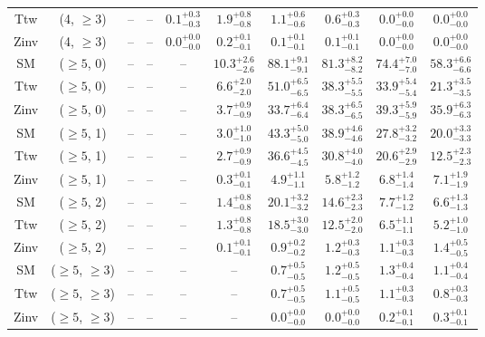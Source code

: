 \begin{table}[h!]
{\begin{tabular}{cccccccccc}
	Ttw & (4, $\ge3$) & -- & -- & $0.1^{+ 0.3 }_{- 0.3 }$ & $1.9^{+ 0.8 }_{- 0.8 }$ & $1.1^{+ 0.6 }_{- 0.6 }$ & $0.6^{+ 0.3 }_{- 0.3 }$ & $0.0^{+ 0.0 }_{- 0.0 }$ & $0.0^{+ 0.0 }_{- 0.0 }$ \\[0.5ex] 
	Zinv & (4, $\ge3$) & -- & -- & $0.0^{+ 0.0 }_{- 0.0 }$ & $0.2^{+ 0.1 }_{- 0.1 }$ & $0.1^{+ 0.1 }_{- 0.1 }$ & $0.1^{+ 0.1 }_{- 0.1 }$ & $0.0^{+ 0.0 }_{- 0.0 }$ & $0.0^{+ 0.0 }_{- 0.0 }$ \\[0.5ex] 
	SM & ($\ge5$, 0) & -- & -- & -- & $10.3^{+ 2.6 }_{- 2.6 }$ & $88.1^{+ 9.1 }_{- 9.1 }$ & $81.3^{+ 8.2 }_{- 8.2 }$ & $74.4^{+ 7.0 }_{- 7.0 }$ & $58.3^{+ 6.6 }_{- 6.6 }$ \\[0.5ex] 
	Ttw & ($\ge5$, 0) & -- & -- & -- & $6.6^{+ 2.0 }_{- 2.0 }$ & $51.0^{+ 6.5 }_{- 6.5 }$ & $38.3^{+ 5.5 }_{- 5.5 }$ & $33.9^{+ 5.4 }_{- 5.4 }$ & $21.3^{+ 3.5 }_{- 3.5 }$ \\[0.5ex] 
	Zinv & ($\ge5$, 0) & -- & -- & -- & $3.7^{+ 0.9 }_{- 0.9 }$ & $33.7^{+ 6.4 }_{- 6.4 }$ & $38.3^{+ 6.5 }_{- 6.5 }$ & $39.3^{+ 5.9 }_{- 5.9 }$ & $35.9^{+ 6.3 }_{- 6.3 }$ \\[0.5ex] 
	SM & ($\ge5$, 1) & -- & -- & -- & $3.0^{+ 1.0 }_{- 1.0 }$ & $43.3^{+ 5.0 }_{- 5.0 }$ & $38.9^{+ 4.6 }_{- 4.6 }$ & $27.8^{+ 3.2 }_{- 3.2 }$ & $20.0^{+ 3.3 }_{- 3.3 }$ \\[0.5ex] 
	Ttw & ($\ge5$, 1) & -- & -- & -- & $2.7^{+ 0.9 }_{- 0.9 }$ & $36.6^{+ 4.5 }_{- 4.5 }$ & $30.8^{+ 4.0 }_{- 4.0 }$ & $20.6^{+ 2.9 }_{- 2.9 }$ & $12.5^{+ 2.3 }_{- 2.3 }$ \\[0.5ex] 
	Zinv & ($\ge5$, 1) & -- & -- & -- & $0.3^{+ 0.1 }_{- 0.1 }$ & $4.9^{+ 1.1 }_{- 1.1 }$ & $5.8^{+ 1.2 }_{- 1.2 }$ & $6.8^{+ 1.4 }_{- 1.4 }$ & $7.1^{+ 1.9 }_{- 1.9 }$ \\[0.5ex] 
	SM & ($\ge5$, 2) & -- & -- & -- & $1.4^{+ 0.8 }_{- 0.8 }$ & $20.1^{+ 3.2 }_{- 3.2 }$ & $14.6^{+ 2.3 }_{- 2.3 }$ & $7.7^{+ 1.2 }_{- 1.2 }$ & $6.6^{+ 1.3 }_{- 1.3 }$ \\[0.5ex] 
	Ttw & ($\ge5$, 2) & -- & -- & -- & $1.3^{+ 0.8 }_{- 0.8 }$ & $18.5^{+ 3.0 }_{- 3.0 }$ & $12.5^{+ 2.0 }_{- 2.0 }$ & $6.5^{+ 1.1 }_{- 1.1 }$ & $5.2^{+ 1.0 }_{- 1.0 }$ \\[0.5ex] 
	Zinv & ($\ge5$, 2) & -- & -- & -- & $0.1^{+ 0.1 }_{- 0.1 }$ & $0.9^{+ 0.2 }_{- 0.2 }$ & $1.2^{+ 0.3 }_{- 0.3 }$ & $1.1^{+ 0.3 }_{- 0.3 }$ & $1.4^{+ 0.5 }_{- 0.5 }$ \\[0.5ex] 
	SM & ($\ge5$, $\ge3$) & -- & -- & -- & -- & $0.7^{+ 0.5 }_{- 0.5 }$ & $1.2^{+ 0.5 }_{- 0.5 }$ & $1.3^{+ 0.4 }_{- 0.4 }$ & $1.1^{+ 0.4 }_{- 0.4 }$ \\[0.5ex] 
	Ttw & ($\ge5$, $\ge3$) & -- & -- & -- & -- & $0.7^{+ 0.5 }_{- 0.5 }$ & $1.1^{+ 0.5 }_{- 0.5 }$ & $1.1^{+ 0.3 }_{- 0.3 }$ & $0.8^{+ 0.3 }_{- 0.3 }$ \\[0.5ex] 
	Zinv & ($\ge5$, $\ge3$) & -- & -- & -- & -- & $0.0^{+ 0.0 }_{- 0.0 }$ & $0.0^{+ 0.0 }_{- 0.0 }$ & $0.2^{+ 0.1 }_{- 0.1 }$ & $0.3^{+ 0.1 }_{- 0.1 }$ \\[0.5ex] 
	\hline
	\hline
\end{tabular}}
\end{table}
